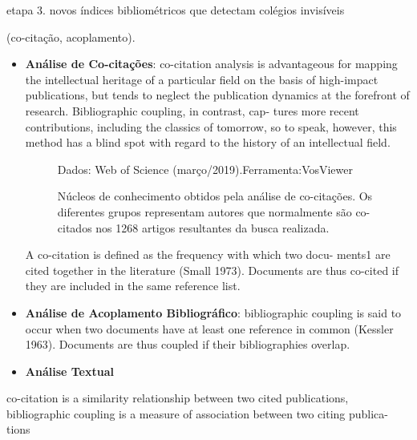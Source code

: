 \documentclass[sigconf]{acmart}
\newcommand{\source}[2]{\raggedleft{}\vspace*{-7mm}\caption*{ \textmd{\scriptsize{Dados: {#1}.\hfill Ferramenta:{#2}}}}}
\begin{document}
etapa 3. 
novos índices bibliométricos que detectam colégios invisíveis 

(co-citação, acoplamento).

  \begin{itemize}
    \item{\textbf{Análise de Co-citações}: co-citation analysis is advantageous for mapping the intellectual heritage of a particular field on the basis of high-impact publications, but tends to neglect the publication dynamics at the forefront of research. Bibliographic coupling, in contrast, cap- tures more recent contributions, including the classics of tomorrow, so to speak, however, this method has a blind spot with regard to the history of an intellectual field.
    \begin{figure}[h]
      \source{Web of Science (março/2019)}{VosViewer\protect{~\cite{VOSviewer}}}
      \caption{Núcleos de conhecimento obtidos pela análise de co-citações. Os diferentes grupos representam autores que normalmente são co-citados nos 1268 artigos resultantes da busca realizada.}
      \label{fig:classicos}
    \end{figure}
    A co-citation is defined as the frequency with which two docu- ments1 are cited together in the literature (Small 1973). Documents are thus co-cited if they are included in the same reference list.}
    \item{\textbf{Análise de Acoplamento Bibliográfico}: bibliographic coupling is said to occur when two documents have at least one reference in common (Kessler 1963). Documents are thus coupled if their bibliographies overlap.}
    \item{\textbf{Análise Textual}}
  \end{itemize}
  co-citation is a similarity relationship between two cited publications, bibliographic coupling is a measure of association between two citing publica- tions 
\end{document}

